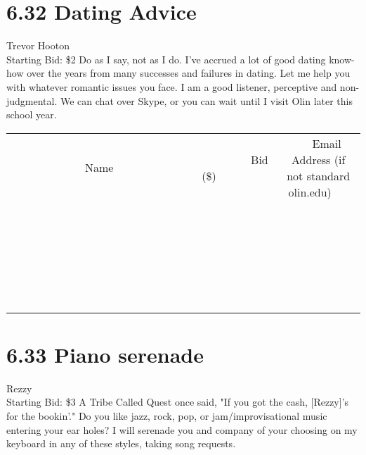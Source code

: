 \documentclass[11pt]{article}
\begin{document}
\section*{6.32 Dating Advice}
Trevor Hooton
\\
Starting Bid: \$2
\newline
Do as I say, not as I do. I've accrued a lot of good dating know-how over the years from many successes and failures in dating. Let me help you with whatever romantic issues you face. I am a good listener, perceptive and non-judgmental. 
We can chat over Skype, or you can wait until I visit Olin later this school year.
\\[6ex]
\begin{tabular}{c c c}
~~~~~~~~~~~~~Name~~~~~~~~~~~~~ & ~~~~~~~~~Bid (\$)~~~~~~~~~  & ~~~Email Address (if not standard olin.edu)~~~\\
 & & \\
\hline
 & & \\
\hline
 & & \\
\hline
 & & \\
\hline
 & & \\
\hline
 & & \\
\hline
 & & \\
\hline
 & & \\
\hline
 & & \\
\hline
 & & \\
\hline
 & & \\
\hline
 & & \\
\hline
 & & \\
\hline
 & & \\
\hline
 & & \\
\hline
 & & \\
\hline
 & & \\
\hline
 & & \\
\hline
 & & \\
\hline
 & & \\
\hline
 & & \\
\hline
 & & \\
\hline
 & & \\
\hline
 & & \\
\hline
 & & \\
\hline
 & & \\
\hline
\end{tabular}
\newpage
\section*{6.33 Piano serenade}
Rezzy
\\
Starting Bid: \$3
\newline
A Tribe Called Quest once said, "If you got the cash, [Rezzy]'s for the bookin'." Do you like jazz, rock, pop, or jam/improvisational music entering your ear holes? I will serenade you and company of your choosing on my keyboard in any of these styles, taking song requests.
\end{document}
